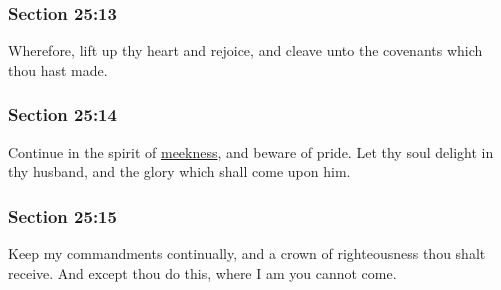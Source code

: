 	\subsubsection{Section 25:13} %
		\label{DC25-13}

		Wherefore, lift up thy heart and rejoice, and cleave unto the covenants which thou hast made.


	\subsubsection{Section 25:14} %
		\label{DC25-14}

		Continue in the spirit of \hyperref[MEEKNESS]{meekness}, and beware of pride.  Let thy soul delight in thy husband, and the glory which shall come upon him.


	\subsubsection{Section 25:15} %
		\label{DC25-15}

		Keep my commandments continually, and a crown of righteousness thou shalt receive.  And except thou do this, where I am you cannot come.


